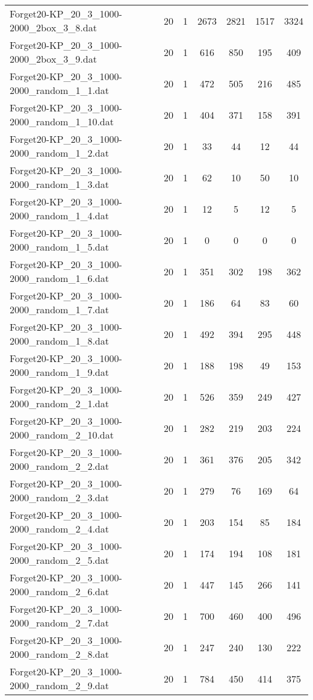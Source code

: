 \begin{table}[!ht]
\begin{tabular}{lcccccc}
Forget20-KP\_20\_3\_1000-2000\_2box\_3\_8.dat & 20 & 1 & 2673 & 2821 & 1517 & 3324 \\
Forget20-KP\_20\_3\_1000-2000\_2box\_3\_9.dat & 20 & 1 & 616 & 850 & 195 & 409 \\
Forget20-KP\_20\_3\_1000-2000\_random\_1\_1.dat & 20 & 1 & 472 & 505 & 216 & 485 \\
Forget20-KP\_20\_3\_1000-2000\_random\_1\_10.dat & 20 & 1 & 404 & 371 & 158 & 391 \\
Forget20-KP\_20\_3\_1000-2000\_random\_1\_2.dat & 20 & 1 & 33 & 44 & 12 & 44 \\
Forget20-KP\_20\_3\_1000-2000\_random\_1\_3.dat & 20 & 1 & 62 & 10 & 50 & 10 \\
Forget20-KP\_20\_3\_1000-2000\_random\_1\_4.dat & 20 & 1 & 12 & 5 & 12 & 5 \\
Forget20-KP\_20\_3\_1000-2000\_random\_1\_5.dat & 20 & 1 & 0 & 0 & 0 & 0 \\
Forget20-KP\_20\_3\_1000-2000\_random\_1\_6.dat & 20 & 1 & 351 & 302 & 198 & 362 \\
Forget20-KP\_20\_3\_1000-2000\_random\_1\_7.dat & 20 & 1 & 186 & 64 & 83 & 60 \\
Forget20-KP\_20\_3\_1000-2000\_random\_1\_8.dat & 20 & 1 & 492 & 394 & 295 & 448 \\
Forget20-KP\_20\_3\_1000-2000\_random\_1\_9.dat & 20 & 1 & 188 & 198 & 49 & 153 \\
Forget20-KP\_20\_3\_1000-2000\_random\_2\_1.dat & 20 & 1 & 526 & 359 & 249 & 427 \\
Forget20-KP\_20\_3\_1000-2000\_random\_2\_10.dat & 20 & 1 & 282 & 219 & 203 & 224 \\
Forget20-KP\_20\_3\_1000-2000\_random\_2\_2.dat & 20 & 1 & 361 & 376 & 205 & 342 \\
Forget20-KP\_20\_3\_1000-2000\_random\_2\_3.dat & 20 & 1 & 279 & 76 & 169 & 64 \\
Forget20-KP\_20\_3\_1000-2000\_random\_2\_4.dat & 20 & 1 & 203 & 154 & 85 & 184 \\
Forget20-KP\_20\_3\_1000-2000\_random\_2\_5.dat & 20 & 1 & 174 & 194 & 108 & 181 \\
Forget20-KP\_20\_3\_1000-2000\_random\_2\_6.dat & 20 & 1 & 447 & 145 & 266 & 141 \\
Forget20-KP\_20\_3\_1000-2000\_random\_2\_7.dat & 20 & 1 & 700 & 460 & 400 & 496 \\
Forget20-KP\_20\_3\_1000-2000\_random\_2\_8.dat & 20 & 1 & 247 & 240 & 130 & 222 \\
Forget20-KP\_20\_3\_1000-2000\_random\_2\_9.dat & 20 & 1 & 784 & 450 & 414 & 375 \\

\end{tabular}
\end{table}
